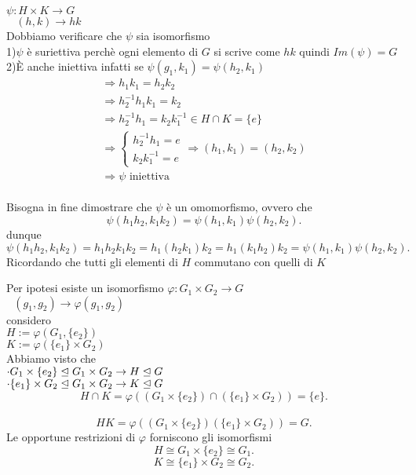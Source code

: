 \documentclass[12px]{article}
\begin{document}
	  \begin{dimo}[1]
	  	$\psi: H\times K \rightarrow G$\\
		$\ \ \ \ (h,k) \rightarrow hk$\\
		Dobbiamo verificare che $\psi$ sia isomorfismo\\
		1)$\psi$ è suriettiva perchè ogni elemento di $G$ si scrive come $hk$ quindi $Im(\psi) = G$\\
		2)È anche iniettiva infatti se  $\psi(g_1,k_1) = \psi(h_2,k_1)$
		\begin{gather*}
			\Rightarrow h_1k_1 = h_2k_2\\
			\Rightarrow h_2^{-1}h_1k_1 = k_2\\
			\Rightarrow h_2^{-1}h_1 = k_2k_1^{-1}\in H\cap K = \{e\}\\
			\Rightarrow \begin{cases}
				h_2^{-1}h_1 = e\\
				k_2k_1^{-1} = e
			\end{cases} \Rightarrow (h_1,k_1) = (h_2,k_2)\\
			\Rightarrow \psi \text{ iniettiva}
		\end{gather*}\\
		Bisogna in fine dimostrare che $\psi$ è un omomorfismo, ovvero che\\
		\[
		\psi(h_1h_2,k_1k_2) = \psi(h_1,k_1)\psi(h_2,k_2)
		.\] 
		dunque
		\[
		\psi(h_1h_2,k_1k_2) = h_1h_2k_1k_2 = h_1(h_2k_1)k_2 = h_1(k_1h_2)k_2 = \psi(h_1,k_1)\psi(h_2,k_2)
		.\] 
		Ricordando che tutti gli elementi di $H$ commutano con quelli di $K$
	  \end{dimo}
	  \begin{dimo}[2]
	  	Per ipotesi esiste un isomorfismo
		$ \varphi: G_1\times G_2 \rightarrow G$\\
		$\ \ \ (g_1,g_2) \rightarrow \varphi(g_1,g_2)$\\
		considero\\
		$H:= \varphi(G_1,\{e_2\})$\\
		$K:= \varphi(\{e_1\}\times G_2)$ \\
		Abbiamo visto che\\
		$\cdot G_1\times \{e_2\}\trianglelefteq G_1\times G_2 \rightarrow H\trianglelefteq G$\\
		$\cdot \{e_1\}\times G_2\trianglelefteq G_1\times G_2 \rightarrow K\trianglelefteq G$ \\
		\[
			H\cap K = \varphi((G_1\times\{e_2\})\cap(\{e_1\}\times G_2)) = \{e\}
		.\] \\
		\[
			HK = \varphi((G_1\times \{e_2\})(\{e_1\}\times G_2)) = G
	.\]
	Le opportune restrizioni di $ \varphi$ forniscono gli isomorfismi
	\[
		H\cong G_1\times \{e_2\}\cong G_1
	.\] 
	\[
		K\cong \{e_1\}\times G_2\cong G_2
	.\] 

	  \end{dimo}
\end{document}
